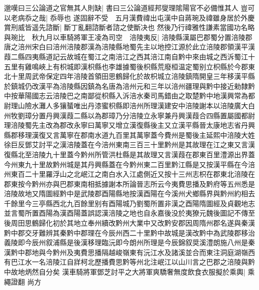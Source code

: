 邈嘆曰三公論道之官無其人則缺|{
	書曰三公論道經邦燮理隂陽官不必備惟其人}
豈可以老病忝之哉|{
	忝辱也}
遂固辭不受　五月漢費禕出屯漢中自蔣琬及禕雖身居於外慶賞刑威皆遥先諮斷|{
	斷丁亂翻諮斷者諮之使斷决也}
然後乃行禕雅性謙素當國功名略與琬比　秋九月以車騎將軍王凌為司空　涪陵夷反|{
	涪陵縣漢屬巴郡蜀分置涪陵郡唐之涪州宋白曰涪州涪陵郡漢為涪陵縣地蜀先主以地控江源於此立涪陵郡領漢平漢葭二縣四夷縣道記云故城在蜀江之南涪江之西其涪江南自黔中來由城之西泝蜀江十五里有雞鳴峽上有枳城即漢枳縣也李雄據蜀後枳縣荒廢桓温定蜀别立枳縣於今郡東北十里周武帝保定四年涪陵首領田思鶴歸化於故枳城立涪陵鎮隋開皇三年移漢平縣於鎮城仍改漢平為涪陵縣因鎮為名唐為涪州元和三年以涪州疆理與黔中接近勑隸黔中按華陽國志云涪陵巴之南鄙從枳縣入泝涪水秦司馬錯由之取楚黔中地漢興常為都尉理山險水灘人多獽蜑唯出丹漆蜜枳縣即涪州所理漢建安中涪陵謝本以涪陵廣大白州牧劉璋分置丹興漢葭二縣以為郡璋乃分涪陵立永寧兼丹興漢葭合四縣置屬國都尉理涪陵蜀先主改為郡改永寧曰萬寧又增立漢復縣後主又立漢平縣晉太康地志省丹興縣郡移理漢復又言萬寧在郡南水道九百里其萬寧蓋今費州是蜀後主延熙中涪陵大姓徐巨反鄧艾討平之漢涪陵蓋在今涪州東南三百三十里黔州是其故理在江之東又言漢復縣北至涪陵九十里蓋今黔州所管洪杜縣是其故理又言漢葭在郡東百里澧源出界蓋今州東九十里故黔州城是其丹興縣蓋在今黔州東二百里黔江縣是又按漢平縣在今涪州東百二十里羅浮山之北岷江之南白水入江處側近又按十三州志枳在郡東北涪陵在郡東按今黔州亦與巴郡東南相抵據謝本所論晉志所云今夷費思播及黔府等五州悉是涪陵故地又隋圖經黔中是武陵郡酉陽縣地按漢酉陽在今溪州犬鄉縣界與黔州約相去千餘里今三亭縣西北九百餘里别有酉陽城乃劉蜀所置非漢之酉陽隋圖經及貞觀地志並言蜀所置酉陽為漢酉陽蓋誤認漢涪陵之地也自永嘉後没於夷獠元魏後圖記不傳至後周田思鶴歸化初於其地立奉州續改黔州大業中又改黔安郡因周隋州郡名遂與秦漢黔中郡交牙難辨其秦黔中郡理在今辰州西二十里黔中故城是漢改黔中為武陵郡移治義陵即今辰州叙浦縣是後漢移理臨沅即今朗州所理是今辰錦叙奨溪澧朗施八州是秦漢黔中郡地與今黔州及夷費思播隔越峻嶺東有沅江水及諸溪並合而東注洞庭湖嶺西有巴江水一名涪陵江自牂柯北歷播費思黔等州北注岷江以山川言之巴郡之涪陵與黔中故地炳然自分矣}
漢車騎將軍鄧芝討平之大將軍爽驕奢無度飲食衣服擬於乘輿|{
	乘繩證翻}
尚方

